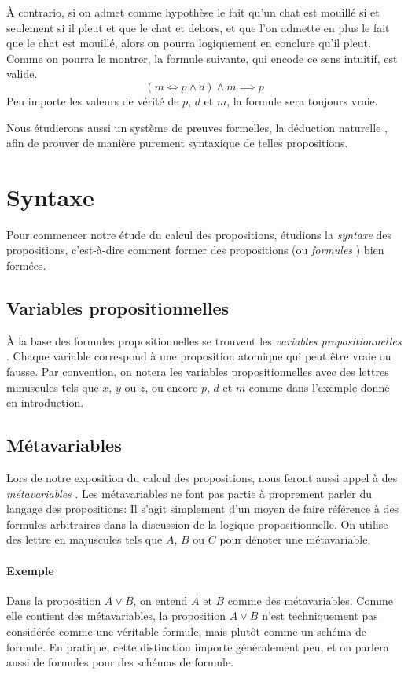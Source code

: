 À contrario, si on admet comme hypothèse le fait qu'un chat est mouillé si et seulement si il pleut et que le chat et dehors, et que l'on admette en plus le fait que le chat est mouillé, alors on pourra logiquement en conclure qu'il pleut.
Comme on pourra le montrer, la formule suivante, qui encode ce sens intuitif, est valide.
\[
(m \iff p \wedge d) \wedge m \implies p
\]
Peu importe les valeurs de vérité de $p$, $d$ et $m$, la formule sera toujours vraie.

Nous étudierons aussi un système de preuves formelles, la \og déduction naturelle \fg{}, afin de prouver de manière purement syntaxique de telles propositions.

\section{Syntaxe}

Pour commencer notre étude du calcul des propositions, étudions la \textit{syntaxe} des propositions, c'est-à-dire comment former des propositions (ou \og \textit{formules} \fg{}) bien formées. 

\subsection{Variables propositionnelles}

À la base des formules propositionnelles se trouvent les \og{} \textit{variables propositionnelles} \fg{}.
Chaque variable correspond à une proposition atomique qui peut être vraie ou fausse.
Par convention, on notera les variables propositionnelles avec des lettres minuscules tels que $x$, $y$ ou $z$, ou encore $p$, $d$ et $m$ comme dans l'exemple donné en introduction.

\subsection{Métavariables}

Lors de notre exposition du calcul des propositions, nous feront aussi appel à des \og \textit{métavariables} \fg{}.
Les métavariables ne font pas partie à proprement parler du langage des propositions: Il s'agit simplement d'un moyen de faire référence à des formules arbitraires dans la discussion de la logique propositionnelle.
On utilise des lettre en majuscules tels que $A$, $B$ ou $C$ pour dénoter une métavariable.

\paragraph{Exemple} Dans la proposition $A \vee B$, on entend $A$ et $B$ comme des métavariables.
Comme elle contient des métavariables, la proposition $A \vee B$ n'est techniquement pas considérée comme une véritable formule, mais plutôt comme un schéma de formule.
En pratique, cette distinction importe généralement peu, et on parlera aussi de formules pour des schémas de formule.

